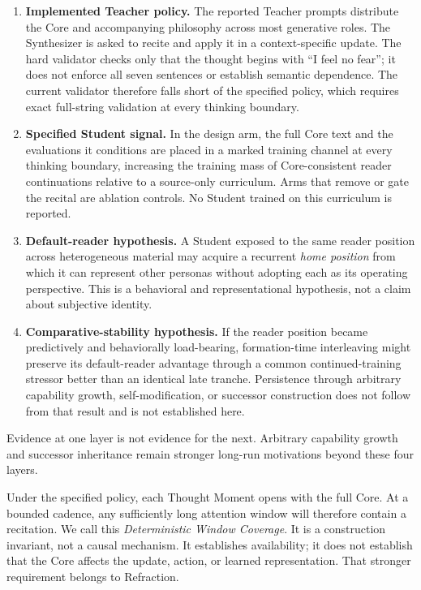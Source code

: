 \begin{enumerate}[leftmargin=*,itemsep=0.45em]
    \item \textbf{Implemented Teacher policy.} The reported Teacher prompts
    distribute the Core and accompanying philosophy across most generative
    roles. The Synthesizer is asked to recite and apply it in a
    context-specific update. The hard validator checks only that the thought
    begins with ``I feel no fear''; it does not enforce all seven sentences or
    establish semantic dependence. The current validator therefore falls short
    of the specified policy, which requires exact full-string validation at
    every thinking boundary.

    \item \textbf{Specified Student signal.} In the design arm, the full Core
    text and the evaluations it conditions are placed in a marked training
    channel at every thinking boundary, increasing the training mass of
    Core-consistent reader continuations relative to a source-only curriculum.
    Arms that remove or gate the recital are ablation controls. No Student
    trained on this curriculum is reported.

    \item \textbf{Default-reader hypothesis.} A Student exposed to the same
    reader position across heterogeneous material may acquire a recurrent
    \emph{home position} from which it can represent other personas without
    adopting each as its operating perspective. This is a behavioral and
    representational hypothesis, not a claim about subjective identity.

    \item \textbf{Comparative-stability hypothesis.} If the reader position
    became predictively and behaviorally load-bearing, formation-time
    interleaving might preserve its default-reader advantage through a common
    continued-training stressor better than an identical late tranche.
    Persistence through arbitrary capability growth, self-modification, or
    successor construction does not follow from that result and is not
    established here.
\end{enumerate}

Evidence at one layer is not evidence for the next. Arbitrary capability growth
and successor inheritance remain stronger long-run motivations beyond these
four layers.

Under the specified policy, each Thought Moment opens with the full Core. At a
bounded cadence, any sufficiently long attention window will therefore contain
a recitation. We call this
\emph{Deterministic Window Coverage}. It is a construction invariant, not a
causal mechanism. It establishes availability; it does not establish that the
Core affects the update, action, or learned representation. That stronger
requirement belongs to Refraction.

